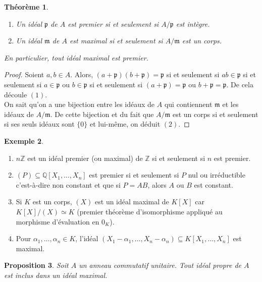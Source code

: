\documentclass{article}
\newcommand{\Z}{\mathbb{Z}}
\newcommand{\Q}{\mathbb{Q}}
\newcommand{\prem}{\mathfrak{p}}
\newcommand{\maxid}{\mathfrak{m}}
\theoremstyle{plain}
\newtheorem{theorem}{Théorème}[subsection]
\newtheorem{proposition}[theorem]{Proposition}
\theoremstyle{definition}
\newtheorem{example}[theorem]{Exemple}
\theoremstyle{remark}
\begin{document}
\begin{theorem} \leavevmode
    \begin{enumerate}
        \item Un idéal $\prem$ de $A$ est premier si et seulement si $A/\prem$ est intègre.
        \item Un idéal $\maxid$ de $A$ est maximal si et seulement si $A/\maxid$ est un corps.
    \end{enumerate}
    En particulier, tout idéal maximal est premier.
\end{theorem}

\begin{proof}
    Soient $a,b \in A$. Alors, $(a+\prem)(b+\prem) = \prem$ si et seulement si $ab \in \prem$ si et seulement si $a \in \prem$ ou $b \in \prem$ si et seulement si $(a+\prem) = \prem$ ou $b +\prem = \prem$. De cela découle $(1)$.\\
    On sait qu'on a une bijection entre les idéaux de $A$ qui contiennent $\maxid$ et les idéaux de $A/\maxid$. De cette bijection et du fait que $A/\maxid$ est un corps si et seulement si ses seuls idéaux sont $\{0\}$ et lui-même, on déduit $(2)$.
\end{proof}

\begin{example} \leavevmode
    \begin{enumerate}
        \item $n\Z$ est un idéal premier (ou maximal) de $\Z$ si et seulement si $n$ est premier.
        \item $(P) \subseteq \Q[X_1,\dots,X_n]$ est premier si et seulement si $P$ nul ou irréductible c'est-à-dire non constant et que si $P=AB$, alors $A$ ou $B$ est constant.
        \item Si $K$ est un corps, $(X)$ est un idéal maximal de $K[X]$ car $K[X]/(X) \simeq K$ (premier théorème d'isomorphisme appliqué au morphisme d'évaluation en $0_K$).
        \item Pour $\alpha_1,\dots,\alpha_n \in K$, l'idéal $(X_1-\alpha_1,\dots,X_n-\alpha_n) \subseteq K[X_1,\dots,X_n]$ est maximal.
    \end{enumerate}
\end{example}

\begin{proposition}
    Soit $A$ un anneau commutatif unitaire. Tout idéal propre de $A$ est inclus dans un idéal maximal.
\end{proposition}
\end{document}
